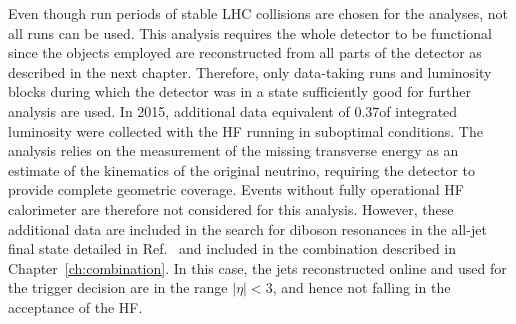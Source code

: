 Even though run periods of stable LHC collisions are chosen for the analyses, not all runs can be used.
This analysis requires the whole detector to be functional since the objects employed are reconstructed from all parts of the detector as described in the next chapter.
Therefore, only data-taking runs and luminosity blocks during which the detector was in a state sufficiently good for further analysis are used.
In 2015, additional data equivalent of 0.37\fbinv of integrated luminosity were collected with the HF running in suboptimal conditions.
The analysis relies on the measurement of the missing transverse energy as an estimate of the kinematics of the original neutrino,
requiring the detector to provide complete geometric coverage. Events without fully operational HF calorimeter are therefore not considered for this analysis.
However, these additional data are included in the search for diboson resonances in the all-jet final state detailed in Ref.~\cite{CMS-PAS-EXO-15-002} and included in the combination described in Chapter~\ref{ch:combination}.
In this case, the jets reconstructed online and used for the trigger decision are in the range $|\eta| < 3$, and hence not falling in the acceptance of the HF.

